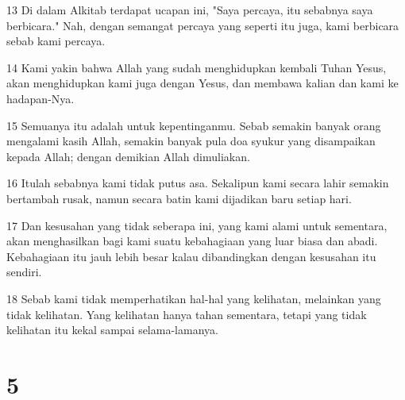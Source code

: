 \par 13 Di dalam Alkitab terdapat ucapan ini, "Saya percaya, itu sebabnya saya berbicara." Nah, dengan semangat percaya yang seperti itu juga, kami berbicara sebab kami percaya.
\par 14 Kami yakin bahwa Allah yang sudah menghidupkan kembali Tuhan Yesus, akan menghidupkan kami juga dengan Yesus, dan membawa kalian dan kami ke hadapan-Nya.
\par 15 Semuanya itu adalah untuk kepentinganmu. Sebab semakin banyak orang mengalami kasih Allah, semakin banyak pula doa syukur yang disampaikan kepada Allah; dengan demikian Allah dimuliakan.
\par 16 Itulah sebabnya kami tidak putus asa. Sekalipun kami secara lahir semakin bertambah rusak, namun secara batin kami dijadikan baru setiap hari.
\par 17 Dan kesusahan yang tidak seberapa ini, yang kami alami untuk sementara, akan menghasilkan bagi kami suatu kebahagiaan yang luar biasa dan abadi. Kebahagiaan itu jauh lebih besar kalau dibandingkan dengan kesusahan itu sendiri.
\par 18 Sebab kami tidak memperhatikan hal-hal yang kelihatan, melainkan yang tidak kelihatan. Yang kelihatan hanya tahan sementara, tetapi yang tidak kelihatan itu kekal sampai selama-lamanya.

\chapter{5}

